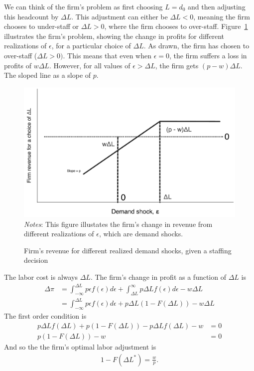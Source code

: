 \documentclass[11pt]{article}
\begin{document}
We can think of the firm's problem as first choosing $L = d_0$ and then adjusting this headcount by $\Delta L$.  
This adjustment can either be $\Delta L < 0$, meaning the firm chooses to under-staff or $\Delta L > 0$, where the firm chooses to over-staff.
Figure~\ref{fig:choice} illustrates the firm's problem, showing the change in profits for different realizations of $\epsilon$, for a particular choice of $\Delta L$.
As drawn, the firm has chosen to over-staff ($\Delta L > 0)$.
This means that even when $\epsilon = 0$, the firm suffers a loss in profits of $w \Delta L$.
However, for all values of $\epsilon > \Delta L$, the firm gets $(p - w)\Delta L$. 
The sloped line as a slope of $p$. 

\begin{figure}[h]
\centering 
\caption{Firm's revenue for different realized demand shocks, given a staffing decision} \label{fig:choice}
\begin{minipage}{0.75 \linewidth}
\includegraphics[width = \linewidth]{./diagrams/firms_optimization_problem.pdf}
\\
\emph{Notes}: This figure illustates the firm's change in revenue from different realizations of $\epsilon$, which are demand
shocks. 
\end{minipage} 
\end{figure}

The labor cost is always $\Delta L$.
The firm's change in profit as a function of $\Delta L$ is 
\begin{align}
  \Delta \pi & = \int_{-\infty}^{\Delta L} p \epsilon f(\epsilon) d\epsilon + \int_{\Delta L}^\infty p \Delta L f(\epsilon) d\epsilon - w \Delta L \nonumber \\
             & = \int_{-\infty}^{\Delta L} p \epsilon f(\epsilon) d\epsilon + p \Delta L \left(1 - F(\Delta L) \right) - w \Delta L
\end{align} 
The first order condition is
\begin{align}
  p \Delta L f(\Delta L) + p \left(1 - F(\Delta L)\right) - p \Delta L f(\Delta L) - w & = 0 \nonumber \\
  p \left(1 - F(\Delta L)\right) - w & = 0 \nonumber 
\end{align} 
And so the the firm's optimal labor adjustment is
\begin{align}
 1 - F(\Delta L^*) = \frac{w}{p}.  
\end{align} 
\end{document}
